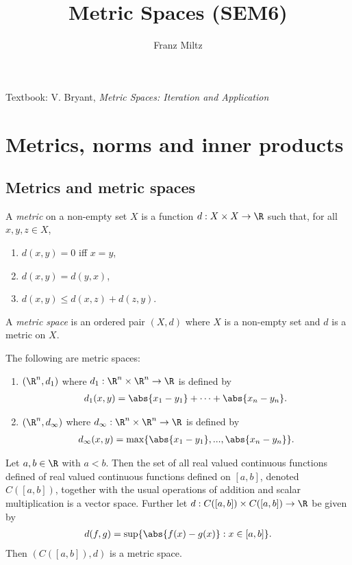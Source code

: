 \documentclass{article}
\begin{document}
\mkthmstwounified
\title{Metric Spaces (SEM6)}
\author{Franz Miltz}
\maketitle
\noindent Textbook: V. Bryant, \emph{Metric Spaces: Iteration and Application}
\tableofcontents
\pagebreak

\section{Metrics, norms and inner products}

\subsection{Metrics and metric spaces}

\begin{definition}
    A \emph{metric} on a non-empty set $X$ is a function $d:X\times X\to\R$
    such that, for all $x,y,z\in X$,
    \begin{enumerate}
        \item $d(x,y)=0$ iff $x=y$,
        \item $d(x,y)=d(y,x)$,
        \item $d(x,y)\leq d(x,z) + d(z,y)$.
    \end{enumerate}
    A \emph{metric space} is an ordered pair $(X,d)$ where $X$ is a non-empty set and
    $d$ is a metric on $X$.
\end{definition}

\begin{lemma}
    The following are metric spaces:
    \begin{enumerate}
        \item $(\R^n, d_1)$ where $d_1:\R^n\times\R^n\to\R$ is defined by \begin{align*}
                  d_1(x,y)=\abs{x_1-y_1}+\cdots+\abs{x_n-y_n}.
              \end{align*}
        \item $(\R^n, d_\infty)$ where $d_\infty:\R^n\times\R^n\to\R$ is defined by \begin{align*} d_\infty(x,y)=\max\{\abs{x_1-y_1},...,\abs{x_n-y_n}\}.
              \end{align*}
    \end{enumerate}
\end{lemma}

\begin{lemma}
    Let $a,b\in\R$ with $a<b$.
    Then the set of all real valued continuous functions defined of real valued
    continuous functions defined on $[a,b]$, denoted $C([a,b])$, together with
    the usual operations of addition and scalar multiplication is a vector space.
    Further let $d:C([a,b])\times C([a,b])\to \R$ be given by
    \begin{align}
        \label{metric-cab}
        d(f,g)=\sup\{\abs{f(x)-g(x)}:x\in[a,b]\}.
    \end{align}
    Then $(C([a,b]),d)$ is a metric space.
\end{lemma}
\end{document}
